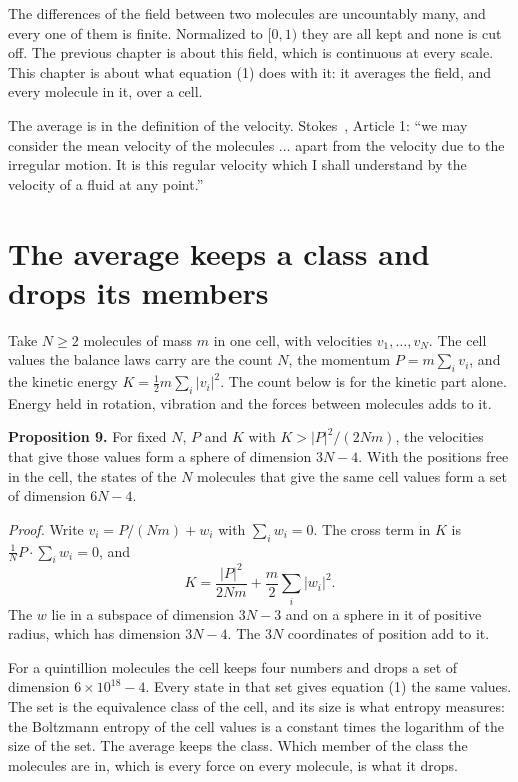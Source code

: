The differences of the field between two molecules are uncountably many, and every one of them is
finite. Normalized to $[0,1)$ they are all kept and none is cut off. The previous chapter is about
this field, which is continuous at every scale. This chapter is about what equation (1) does with
it: it averages the field, and every molecule in it, over a cell.

The average is in the definition of the velocity. Stokes~\cite{src:Stokes-1845}, Article 1: ``we
may consider the mean velocity of the molecules ... apart
from the velocity due to the irregular motion. It is this regular velocity which I shall understand
by the velocity of a fluid at any point.''

\section{The average keeps a class and drops its members}

Take $N \ge 2$ molecules of mass $m$ in one cell, with velocities $v_1,\dots,v_N$. The cell values the
balance laws carry are the count $N$, the momentum $P = m\sum_i v_i$, and the kinetic energy
$K = \tfrac12 m\sum_i |v_i|^2$. The count below is for the kinetic part alone. Energy held in
rotation, vibration and the forces between molecules adds to it.

\textbf{Proposition 9.} For fixed $N$, $P$ and $K$ with $K > |P|^2/(2Nm)$, the velocities that give
those values form a sphere of dimension $3N-4$. With the positions free in the cell, the states of
the $N$ molecules that give the same cell values form a set of dimension $6N-4$.

\emph{Proof.} Write $v_i = P/(Nm) + w_i$ with $\sum_i w_i = 0$. The cross term in $K$ is
$\tfrac{1}{N}P\cdot\sum_i w_i = 0$, and
\[
K = \frac{|P|^2}{2Nm} + \frac{m}{2}\sum_i |w_i|^2 .
\]
The $w$ lie in a subspace of dimension $3N-3$ and on a sphere in it of positive radius, which has
dimension $3N-4$. The $3N$ coordinates of position add to it. \hfill\qedsymbol

For a quintillion molecules the cell keeps four numbers and drops a set of dimension
$6\times 10^{18} - 4$. Every state in that set gives equation (1) the same values. The set is the
equivalence class of the cell, and its size is what entropy measures: the Boltzmann entropy of the
cell values is a constant times the logarithm of the size of the set. The average keeps the class.
Which member of the class the molecules are in, which is every force on every molecule, is what it
drops.

